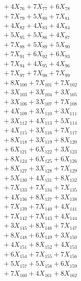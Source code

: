 \documentclass[a4paper,10pt]{article}
\begin{document}
{\begin{align}
&\;  + 4 X_{76} + 7 X_{77} + 6 X_{78} \\[0.3ex]
&\;  + 7 X_{79} + 5 X_{80} + 7 X_{81} \\[0.3ex]
&\;  + 4 X_{82} + 4 X_{83} + 4 X_{84} \\[0.3ex]
&\;  + 5 X_{85} + 5 X_{86} + 4 X_{87} \\[0.3ex]
&\;  + 7 X_{88} + 5 X_{89} + 5 X_{90} \\[0.3ex]
&\;  + 7 X_{91} + 6 X_{92} + 6 X_{93} \\[0.3ex]
&\;  + 7 X_{94} + 4 X_{95} + 4 X_{96} \\[0.3ex]
&\;  + 7 X_{97} + 7 X_{98} + 7 X_{99} \\[0.5ex]\allowbreak
&\;  + 8 X_{100} + 7 X_{101} + 7 X_{102} \\[0.3ex]
&\;  + 3 X_{103} + 3 X_{104} + 3 X_{105} \\[0.3ex]
&\;  + 3 X_{106} + 3 X_{107} + 7 X_{108} \\[0.3ex]
&\;  + 4 X_{109} + 3 X_{110} + 3 X_{111} \\[0.3ex]
&\;  + 3 X_{112} + 4 X_{113} + 5 X_{114} \\[0.3ex]
&\;  + 4 X_{115} + 3 X_{116} + 7 X_{117} \\[0.3ex]
&\;  + 8 X_{118} + 3 X_{119} + 8 X_{120} \\[0.3ex]
&\;  + 6 X_{121} + 6 X_{122} + 3 X_{123} \\[0.3ex]
&\;  + 8 X_{124} + 6 X_{125} + 6 X_{126} \\[0.3ex]
&\;  + 8 X_{127} + 3 X_{128} + 7 X_{129} \\[0.5ex]\allowbreak
&\;  + 5 X_{130} + 4 X_{131} + 8 X_{132} \\[0.3ex]
&\;  + 7 X_{133} + 7 X_{134} + 7 X_{135} \\[0.3ex]
&\;  + 4 X_{136} + 8 X_{137} + 3 X_{138} \\[0.3ex]
&\;  + 7 X_{139} + 7 X_{140} + 4 X_{141} \\[0.3ex]
&\;  + 7 X_{142} + 7 X_{143} + 4 X_{144} \\[0.3ex]
&\;  + 3 X_{145} + 8 X_{146} + 7 X_{147} \\[0.3ex]
&\;  + 8 X_{148} + 6 X_{149} + 3 X_{150} \\[0.3ex]
&\;  + 4 X_{151} + 8 X_{152} + 4 X_{153} \\[0.3ex]
&\;  + 6 X_{154} + 7 X_{155} + 7 X_{156} \\[0.3ex]
&\;  + 5 X_{157} + 5 X_{158} + 6 X_{159} \\[0.5ex]\allowbreak
&\;  + 7 X_{160} + 4 X_{161} + 8 X_{162} \\[0.3ex]

\end{align}}
\end{document}
